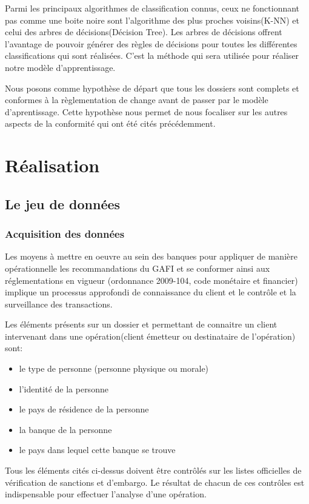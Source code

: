 Parmi les principaux algorithmes de classification connus, ceux ne
fonctionnant pas comme une boite noire sont l'algorithme des plus proches
voisins(K-NN) et celui des arbres de décisions(Décision Tree). Les arbres de
décisions offrent l'avantage de pouvoir générer des règles de décisions pour
toutes les différentes classifications qui sont réalisées. C'est la méthode qui
sera utilisée pour réaliser notre modèle d'apprentissage.

Nous posons comme hypothèse de départ que tous les dossiers sont complets et 
conformes à la règlementation de change avant de passer par le modèle
d'aprentissage. Cette hypothèse nous permet de nous focaliser sur les autres
aspects de la conformité qui ont été cités précédemment.

\section{Réalisation}

\subsection{Le jeu de données}

\subsubsection{Acquisition des données}

Les moyens à mettre en oeuvre au sein des banques pour appliquer de manière
opérationnelle les recommandations du GAFI et se conformer ainsi aux
réglementations en vigueur (ordonnance 2009-104, code monétaire et financier)
implique un processus approfondi de connaissance du client et le contrôle et
la surveillance des transactions.

Les éléments présents sur un dossier et permettant de connaitre un client
intervenant dans une opération(client émetteur ou destinataire de l'opération)
sont:
\begin{itemize}
  \item le type de personne (personne physique ou morale)
  \item l'identité de la personne
  \item le pays de résidence de la personne
  \item la banque de la personne
  \item le pays dans lequel cette banque se trouve
\end{itemize}
Tous les éléments cités ci-dessus doivent être contrôlés sur les listes
officielles de vérification de sanctions et d'embargo. Le résultat de chacun
de ces contrôles est indispensable pour effectuer l'analyse d'une opération.

